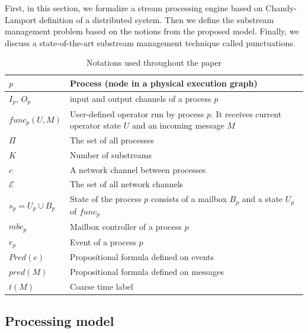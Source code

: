 \label{fs-acker-preliminaries}

First, in this section, we formalize a stream processing engine based on Chandy-Lamport definition of a distributed system. Then we define the substream management problem based on the notions from the proposed model. Finally, we discuss a state-of-the-art substream management technique called punctuations.

\begin{table}[!b]
    \caption{Notations used throughout the paper}
    \footnotesize
    \begin{tabular}{l|p{5cm}}
        \hline
        $p$ & Process (node in a physical execution graph) \\ 
        \hline
        $I_p$, $O_p$ & input and output channels of a process $p$ \\ 
        \hline
        $func_p(U, M)$ & User-defined operator run by process $p$. It receives current operator state $U$ and an incoming message $M$ \\ 
        \hline
        $\Pi$ & The set of all processes  \\
        \hline
        $K$ & Number of substreams  \\
        \hline
        $c$ & A network channel between processes  \\
        \hline
        $\mathcal{E}$ & The set of all network channels  \\
        \hline
        $s_p = U_p \cup B_p$ & State of the process $p$ consists of a mailbox $B_p$ and a state $U_p$ of $func_p$ \\
        \hline
        $mbc_{p}$ & Mailbox controller of a process $p$ \\
        \hline
        $e_{p}$ & Event of a process $p$ \\
        \hline
        $Pred(e)$ & Propositional formula defined on events \\
        \hline
        $pred(M)$ & Propositional formula defined on messages\\
        \hline
        $t(M)$ & Coarse time label \\
    \end{tabular}
    \label{notations}
\end{table}

\subsection{Processing model}
\label{fs-acker-processing-model}

